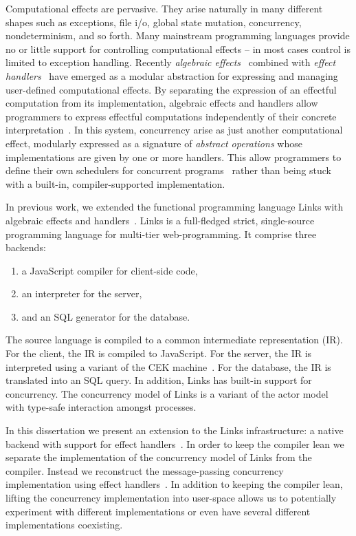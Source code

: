 \documentclass[12pt,mscres,cdtppar,twoside,openright,logo,rightchapter,normalheadings]{infthesis}
\theoremstyle{definition}
\begin{document}
Computational effects are pervasive. They arise naturally in many
different shapes such as exceptions, file i/o, global state mutation,
concurrency, nondeterminism, and so forth. Many mainstream programming
languages provide no or little support for controlling computational
effects -- in most cases control is limited to exception
handling. Recently \emph{algebraic
  effects}~\citep{Plotkin2001,Plotkin2003} combined with \emph{effect
  handlers}~\citep{Plotkin2013} have emerged as a modular abstraction
for expressing and managing user-defined computational effects. By
separating the expression of an effectful computation from its
implementation, algebraic effects and handlers allow programmers to
express effectful computations independently of their concrete
interpretation~\citep{Kammar2013}. In this system, concurrency arise
as just another computational effect, modularly expressed as a
signature of \emph{abstract operations} whose implementations are
given by one or more handlers. This allow programmers to define their
own schedulers for concurrent programs~\citep{Dolan2015} rather than
being stuck with a built-in, compiler-supported implementation.

In previous work, we extended the functional programming language
Links with algebraic effects and
handlers~\citep{Hillerstrom2015}. Links is a full-fledged strict,
single-source programming language for multi-tier web-programming. It
comprise three backends:
\begin{enumerate}
  \item a JavaScript compiler for client-side code,
  \item an interpreter for the server,
  \item and an SQL generator for the database.
\end{enumerate}
The source language is compiled to a common intermediate
representation (IR).  For the client, the IR is compiled to
JavaScript. For the server, the IR is interpreted using a variant of
the CEK machine~\citep{Felleisen1986,Hillerstrom2016a}. For the
database, the IR is translated into an SQL query.
%
In addition, Links has built-in support for concurrency. The
concurrency model of Links is a variant of the actor
model~\citep{Hewitt1977} with type-safe interaction amongst processes.

In this dissertation we present an extension to the Links
infrastructure: a native backend with support for effect
handlers~\citep{Hillerstrom2016b}. In order to keep the compiler lean
we separate the implementation of the concurrency model of Links from
the compiler. Instead we reconstruct the message-passing concurrency
implementation using effect handlers~\citep{Hillerstrom2016c}. In
addition to keeping the compiler lean, lifting the concurrency
implementation into user-space allows us to potentially experiment
with different implementations or even have several different
implementations coexisting.
\end{document}
